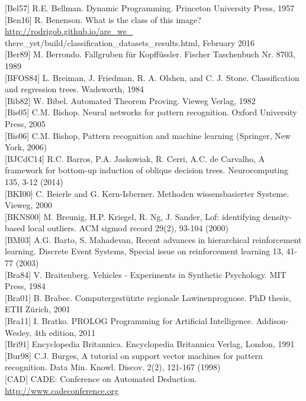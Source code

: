 \documentclass[10pt]{article}
\begin{document}
[Bel57] R.E. Bellman. Dynamic Programming. Princeton University Press, 1957\\[0pt]
[Ben16] R. Benenson. What is the class of this image? \href{http://rodrigob.github.io/are_we_}{http://rodrigob.github.io/are\_we\_} there\_yet/build/classification\_datasets\_results.html, February 2016\\[0pt]
[Ber89] M. Berrondo. Fallgruben für Kopffüssler. Fischer Taschenbuch Nr. 8703, 1989\\[0pt]
[BFOS84] L. Breiman, J. Friedman, R. A. Olshen, and C. J. Stone. Classification and regression trees. Wadsworth, 1984\\[0pt]
[Bib82] W. Bibel. Automated Theorem Proving. Vieweg Verlag, 1982\\[0pt]
[Bis05] C.M. Bishop. Neural networks for pattern recognition. Oxford University Press, 2005\\[0pt]
[Bis06] C.M. Bishop, Pattern recognition and machine learning (Springer, New York, 2006)\\[0pt]
[BJCdC14] R.C. Barros, P.A. Jaskowiak, R. Cerri, A.C. de Carvalho, A framework for bottom-up induction of oblique decision trees. Neurocomputing 135, 3-12 (2014)\\[0pt]
[BKI00] C. Beierle and G. Kern-Isberner. Methoden wissensbasierter Systeme. Vieweg, 2000\\[0pt]
[BKNS00] M. Breunig, H.P. Kriegel, R. Ng, J. Sander, Lof: identifying density-based local outliers. ACM sigmod record 29(2), 93-104 (2000)\\[0pt]
[BM03] A.G. Barto, S. Mahadevan, Recent advances in hierarchical reinforcement learning. Discrete Event Systems, Special issue on reinforcement learning 13, 41-77 (2003)\\[0pt]
[Bra84] V. Braitenberg. Vehicles - Experiments in Synthetic Psychology. MIT Press, 1984\\[0pt]
[Bra01] B. Brabec. Computergestützte regionale Lawinenprognose. PhD thesis, ETH Zürich, 2001\\[0pt]
[Bra11] I. Bratko. PROLOG Programming for Artificial Intelligence. Addison-Wesley, 4th edition, 2011\\[0pt]
[Bri91] Encyclopedia Britannica. Encyclopedia Britannica Verlag, London, 1991\\[0pt]
[Bur98] C.J. Burges, A tutorial on support vector machines for pattern recognition. Data Min. Knowl. Discov. 2(2), 121-167 (1998)\\[0pt]
[CAD] CADE: Conference on Automated Deduction. \href{http://www.cadeconference.org}{http://www.cadeconference.org}\\[0pt]
\end{document}
